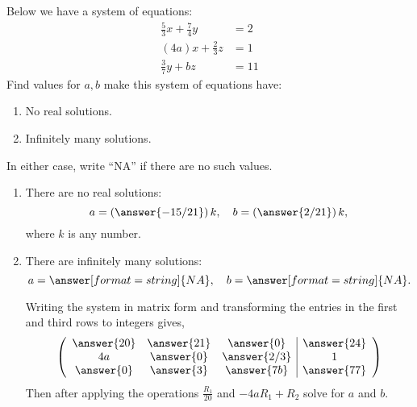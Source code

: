 \documentclass{ximera}
\author{Parisa Fatheddin}
\begin{document}
\begin{exercise}
  Below we have a system of equations:
\begin{align*}
\frac{5}{3}x + \frac{7}{4}y &= 2\\
(4a)x + \frac{2}{3}z &= 1\\
\frac{3}{7} y + bz &= 11
\end{align*}
Find values for $a,b$ make this system of equations have:
\begin{enumerate}
\item No real solutions.
\item Infinitely many solutions.
\end{enumerate}
In either case, write ``NA'' if there are no such values.
\begin{prompt}
  \begin{enumerate}
  \item  There are no real solutions:
    \[
    a = \left(\answer{-15/21}\right)k,\quad  b= \left(\answer{2/21}\right)k,
    \]
    where $k$ is any number.
  \item There are infinitely many solutions:
    \[
    a = \answer[format=string]{NA},\quad b= \answer[format=string]{NA}.
    \]
\begin{hint}
Writing the system in matrix form and transforming the entries in the first and third rows to integers gives,
\[
\left(\begin{array}{ccc|c}
  \answer{20} &  \answer{21} & \answer{0} &\answer{24} \\
  4a &  \answer{0} & \answer{2/3} & 1\\
  \answer{0} &  \answer{3} & \answer{7b} & \answer{77}
\end{array}\right)
\]
Then after applying the operations $\frac{R_{1}}{20}$ and $-4a R_{1} + R_{2}$ solve for $a$ and $b$.
\end{hint}
  \end{enumerate}
\end{prompt}
\end{exercise}
\end{document}
